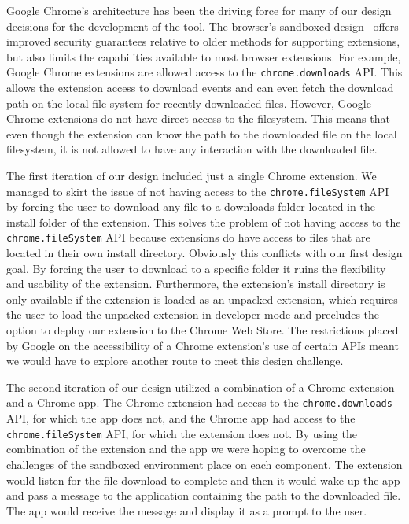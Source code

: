 \documentclass[letterpaper,twocolumn,10pt]{article}
\begin{document}
Google Chrome's architecture has been the driving force for many of our design decisions
for the development of the tool. The browser's sandboxed design~\cite{chromium-security}
offers improved security guarantees relative to older methods for supporting extensions,
but also limits the capabilities available to most browser extensions.
For example, Google Chrome extensions are allowed access to the \texttt{chrome.downloads} API.
This allows the extension access to download events and can even fetch the download path on the
local file system for recently downloaded files. However, Google Chrome extensions do not have
direct access to the filesystem. This means that even though the extension can know
the path to the downloaded file on the local filesystem, it is not allowed to have any interaction with
the downloaded file.

The first iteration of our design included just a single Chrome extension. We managed to skirt the
issue of not having access to the \texttt{chrome.fileSystem} API by forcing the user to download
any file to a downloads folder located in the install folder of the extension. This solves the problem
of not having access to the \texttt{chrome.fileSystem} API because extensions do have access to
files that are located in their own install directory. Obviously this conflicts with our first design goal.
By forcing the user to download to a specific folder it ruins the flexibility and usability of the extension.
Furthermore, the extension’s install directory is only available if the extension is loaded as an unpacked
extension, which requires the user to load the unpacked extension in developer mode and precludes
the option to deploy our extension to the Chrome Web Store. The restrictions placed by Google on
the accessibility of a Chrome extension’s use of certain APIs meant we would have to explore another
route to meet this design challenge.

The second iteration of our design utilized a combination of a Chrome extension and a Chrome app.
The Chrome extension had access to the \texttt{chrome.downloads} API, for which the app does not,
and the Chrome app had access to the \texttt{chrome.fileSystem} API, for which the extension does not.
By using the combination of the extension and the app we were hoping to overcome the challenges of the
sandboxed environment place on each component. The extension would listen for the file download to
complete and then it would wake up the app and pass a message to the application containing the
path to the downloaded file. The app would receive the message and display it as a prompt to the user.
\end{document}

